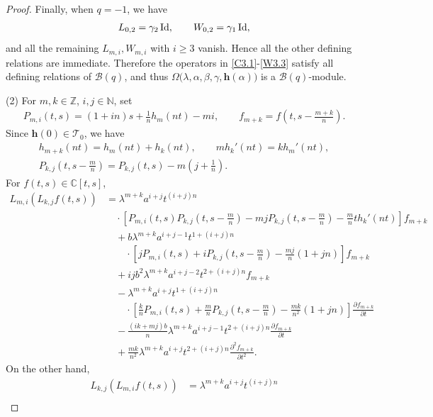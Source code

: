 \documentclass[a4paper]{amsart}
\numberwithin{equation}{section}
\begin{document}
\begin{proof}
	Finally, when $q=-1$, we have
	\begin{align*}
	L_{0,2}=\gamma_2\,{\rm Id},\qquad W_{0,2}=\gamma_1\,{\rm Id},
	\end{align*}
	and all the remaining $L_{m,i},W_{m,i}$ with $i\ge 3$ vanish. Hence all the other defining relations are immediate. Therefore the operators in \eqref{C3.1}-\eqref{W3.3} satisfy all defining relations of $\mathcal{B}(q)$, and thus $\Omega\big(\lambda,\alpha,\beta,\gamma,\mathbf h(\alpha)\big)$ is a $\mathcal{B}(q)$-module.

{\rm (2)}
		For $m,k\in\mathbb Z$, $i,j\in\mathbb N$, set
		\begin{align*}
		P_{m,i}(t,s)=(1+in)s+\frac1n h_m(nt)-mi,
		\qquad f_{m+k}=f\left(t,s-\frac{m+k}{n}\right).
		\end{align*}
		Since $\mathbf h(0)\in\mathcal T_0$, we have
		\begin{gather*}
		h_{m+k}(nt)=h_m(nt)+h_k(nt),\qquad mh_k'(nt)=kh_m'(nt),\\
		P_{k,j}\left(t,s-\frac mn\right)=P_{k,j}(t,s)-m\left(j+\frac1n\right).
		\end{gather*}
		For $f(t,s)\in\mathbb C[t,s]$, 
		{\small
		\begin{align*}
		L_{m,i}(L_{k,j}f(t,s))
		&=\lambda^{m+k}a^{i+j}t^{(i+j)n}\\
		&\quad\cdot\left[P_{m,i}(t,s)P_{k,j}\left(t,s-\frac mn\right)
		-mjP_{k,j}\left(t,s-\frac mn\right)-\frac mn t h_k'(nt)\right]f_{m+k}\\
		&\quad+b\lambda^{m+k}a^{i+j-1}t^{1+(i+j)n}\\
		&\qquad\cdot\left[jP_{m,i}(t,s)+iP_{k,j}\left(t,s-\frac mn\right)-\frac{mj}{n}(1+jn)\right]f_{m+k}\\
		&\quad+ijb^2\lambda^{m+k}a^{i+j-2}t^{2+(i+j)n}f_{m+k}\\
		&\quad-\lambda^{m+k}a^{i+j}t^{1+(i+j)n}\\
		&\qquad\cdot\left[\frac knP_{m,i}(t,s)+\frac mnP_{k,j}\left(t,s-\frac mn\right)
		-\frac{mk}{n^2}(1+jn)\right]\frac{\partial f_{m+k}}{\partial t}\\
		&\quad-\frac{(ik+mj)b}{n}\lambda^{m+k}a^{i+j-1}t^{2+(i+j)n}
		\frac{\partial f_{m+k}}{\partial t}\\
		&\quad+\frac{mk}{n^2}\lambda^{m+k}a^{i+j}t^{2+(i+j)n}
		\frac{\partial^2f_{m+k}}{\partial t^2}.
		\end{align*}
		}
		On the other hand,
		{\small
		\begin{align*}
		L_{k,j}(L_{m,i}f(t,s))
		&=\lambda^{m+k}a^{i+j}t^{(i+j)n}\\

\end{align*}}
\end{proof}
\end{document}
